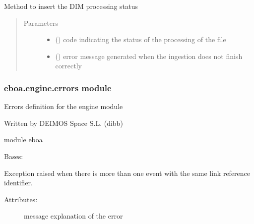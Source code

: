 \begin{fulllineitems}
\label{\detokenize{eboa.engine:eboa.engine.engine.insert_source_status}}
Method to insert the DIM processing status
\begin{quote}\begin{description}
\item[{Parameters}] \leavevmode\begin{itemize}
\item {} 
 () \textendash{} code indicating the status of the processing of the file

\item {} 
 () \textendash{} error message generated when the ingestion does not finish correctly

\end{itemize}

\end{description}\end{quote}

\end{fulllineitems}



\subsubsection{eboa.engine.errors module}
\label{\detokenize{eboa.engine:module-eboa.engine.errors}}\label{\detokenize{eboa.engine:eboa-engine-errors-module}}
Errors definition for the engine module

Written by DEIMOS Space S.L. (dibb)

module eboa

\begin{fulllineitems}
\label{\detokenize{eboa.engine:eboa.engine.errors.DuplicatedEventLinkRef}}
Bases: {\hyperref[\detokenize{eboa.engine:eboa.engine.errors.Error}]{}}

Exception raised when there is more than one event with the same link reference identifier.
\begin{description}
\item[{Attributes:}] \leavevmode
message \textendash{} explanation of the error

\end{description}

\end{fulllineitems}

